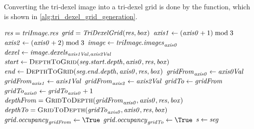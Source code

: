 Converting the tri-dexel image into a tri-dexel grid is done by the  function, which is shown in \cref{alg:tri_dexel_grid_generation}.
%
\begin{algorithm}
	\centering
	\begin{algorithmic}[1]
			\State $\mathit{res} = \mathit{triImage}.\mathit{res}$
			\State $\mathit{grid} = \mathit{TriDexelGrid}(\mathit{res}, \mathit{box})$ 
				\State $\mathit{axis1} \gets (\mathit{axis0} + 1) \bmod 3$
				\State $\mathit{axis2} \gets (\mathit{axis0} + 2) \bmod 3$
				\State $\mathit{image} \gets \mathit{triImage}.\mathit{images}_{\mathit{axis0}}$
						\State $\mathit{dexel} \gets \mathit{image}.\mathit{dexels}_{\mathit{axis1Val}, \mathit{axis2Val}}$
							\State $\var{start} \gets \Call{DepthToGrid}{\var{seg}.\var{start}.\var{depth}, \var{axis0}, \var{res}, \var{box}}$
							\State $\var{end} \gets \Call{DepthToGrid}{\var{seg}.\var{end}.\var{depth}, \var{axis0}, \var{res}, \var{box}}$
								\State $\mathit{gridFrom}_{\mathit{axis0}} \gets \mathit{axis0Val}$
								\State $\mathit{gridFrom}_{\mathit{axis1}} \gets \mathit{axis1Val}$
								\State $\mathit{gridFrom}_{\mathit{axis2}} \gets \mathit{axis2Val}$
								\State $\mathit{gridTo} \gets \mathit{gridFrom}$
								\State $\mathit{gridTo}_{\mathit{axis0}} \gets \mathit{gridTo}_{\mathit{axis0}} + 1$
								\State $\var{depthFrom} = \Call{GridToDepth}{\var{gridFrom}_{\var{axis0}}, \var{axis0}, \var{res}, \var{box}}$
								\State $\var{depthTo}   = \Call{GridToDepth}{\var{gridTo}_{\var{axis0}}, \var{axis0}, \var{res}, \var{box}}$
									\State $\var{grid}.\var{occupancy}_{\var{gridFrom}} \gets \True$
								\EndIf
									\State $\var{grid}.\var{occupancy}_{\var{gridTo}} \gets \True$
								\EndIf
								\State $\mathit{s} \gets \mathit{seg}$

\end{algorithmic}
\end{algorithm}
